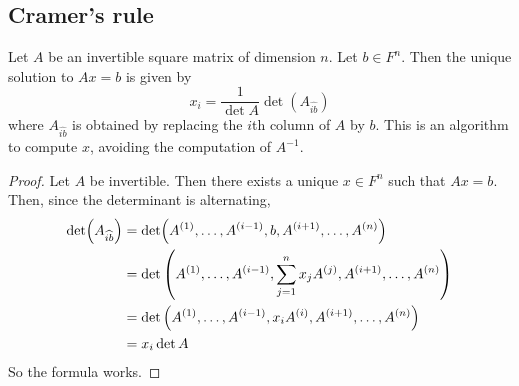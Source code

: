 \subsection{Cramer's rule}
\begin{proposition}
	Let \( A \) be an invertible square matrix of dimension \( n \).
	Let \( b \in F^n \).
	Then the unique solution to \( Ax = b \) is given by
	\[
		x_i = \frac{1}{\det A} \det (A_{\widehat{ib}})
	\]
	where \( A_{\widehat{ib}} \) is obtained by replacing the \( i\)th column of \( A \) by \( b \).
	This is an algorithm to compute \( x \), avoiding the computation of \( A^{-1} \).
\end{proposition}
\begin{proof}
	Let \( A \) be invertible.
	Then there exists a unique \( x \in F^n \) such that \( Ax = b \).
	Then, since the determinant is alternating,
	\begin{align*}
		\det (A_{\widehat{ib}}) & = \det(A^{(1)}, \dots, A^{(i-1)}, b, A^{(i+1)}, \dots, A^{(n)})                            \\
		                        & = \det\qty(A^{(1)}, \dots, A^{(i-1)}, \sum_{j=1}^n x_j A^{(j)}, A^{(i+1)}, \dots, A^{(n)}) \\
		                        & = \det\qty(A^{(1)}, \dots, A^{(i-1)}, x_i A^{(i)}, A^{(i+1)}, \dots, A^{(n)})              \\
		                        & = x_i \det A
	\end{align*}
	So the formula works.
\end{proof}
